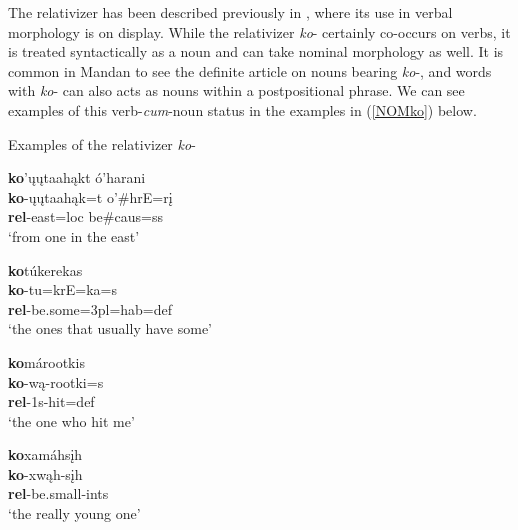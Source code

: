\label{SubSubSubRelativizerKO}

The relativizer has been described previously in , where its use in verbal morphology is on display. While the relativizer \textit{ko}- certainly co-occurs on verbs, it is treated syntactically as a noun and can take nominal morphology as well. It is common in Mandan to see the definite article on nouns bearing \textit{ko}-, and words with \textit{ko}- can also acts as nouns within a postpositional phrase. We can see examples of this verb-\textit{cum}-noun status in the examples in (\ref{NOMko}) below.

\begin{exe}

\item\label{NOMko} Examples of the relativizer \textit{ko}-

\begin{xlist}

\item\label{NOMko1} \glll \textbf{ko}'ųųtaahąkt ó'harani\\
    \textbf{ko}-ųųtaahąk=t o'\#hrE=rį\\
    \textbf{rel}-\textnormal{east}=loc \textnormal{be}\#caus=ss\\
    \glt `from one in the east' \citep[109]{hollow1973a}

\item\label{NOMko2} \glll \textbf{ko}túkerekas\\
    \textbf{ko}-tu=krE=ka=s\\
    \textbf{rel}-\textnormal{be.some}=3pl=hab=def\\
    \glt `the ones that usually have some' \citep[84]{hollow1973b}
    
\item\label{NOMko3} \glll \textbf{ko}márootkis\\
    \textbf{ko}-wą-rootki=s\\
    \textbf{rel}-1s-\textnormal{hit}=def\\
    \glt `the one who hit me' \citep[452]{hollow1970}

\item\label{NOMko4} \glll \textbf{ko}xamáhsįh\\
    \textbf{ko}-xwąh-sįh\\
    \textbf{rel}-\textnormal{be.small}-ints\\
    \glt `the really young one' \citep[31]{trechter2012}

\end{xlist}

\end{exe}

